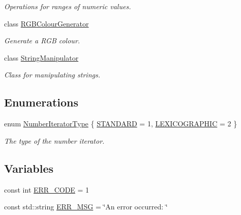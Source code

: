 \begin{DoxyCompactItemize}
\begin{DoxyCompactList}\small\item\em Operations for ranges of numeric values. \end{DoxyCompactList}\item 
class \hyperlink{classmultiscale_1_1RGBColourGenerator}{R\-G\-B\-Colour\-Generator}
\begin{DoxyCompactList}\small\item\em Generate a R\-G\-B colour. \end{DoxyCompactList}\item 
class \hyperlink{classmultiscale_1_1StringManipulator}{String\-Manipulator}
\begin{DoxyCompactList}\small\item\em Class for manipulating strings. \end{DoxyCompactList}\end{DoxyCompactItemize}
\subsection*{Enumerations}
\begin{DoxyCompactItemize}
\item 
enum \hyperlink{namespacemultiscale_a6ef911f4d48a4bf5e657c237ec169ff5}{Number\-Iterator\-Type} \{ \hyperlink{namespacemultiscale_a6ef911f4d48a4bf5e657c237ec169ff5aa048887eb0360a4b70dff5452133f42e}{S\-T\-A\-N\-D\-A\-R\-D} = 1, 
\hyperlink{namespacemultiscale_a6ef911f4d48a4bf5e657c237ec169ff5a2cba3a0174cc5c1d555ee13dcf6cda15}{L\-E\-X\-I\-C\-O\-G\-R\-A\-P\-H\-I\-C} = 2
 \}
\begin{DoxyCompactList}\small\item\em The type of the number iterator. \end{DoxyCompactList}\end{DoxyCompactItemize}
\subsection*{Variables}
\begin{DoxyCompactItemize}
\item 
const int \hyperlink{namespacemultiscale_a4ee40795105048ee371efeeb7962ecf6}{E\-R\-R\-\_\-\-C\-O\-D\-E} = 1
\item 
const std\-::string \hyperlink{namespacemultiscale_a06490e4e11ef359aa0260f96579ce584}{E\-R\-R\-\_\-\-M\-S\-G} = \char`\"{}An error occurred\-: \char`\"{}
\end{DoxyCompactItemize}


